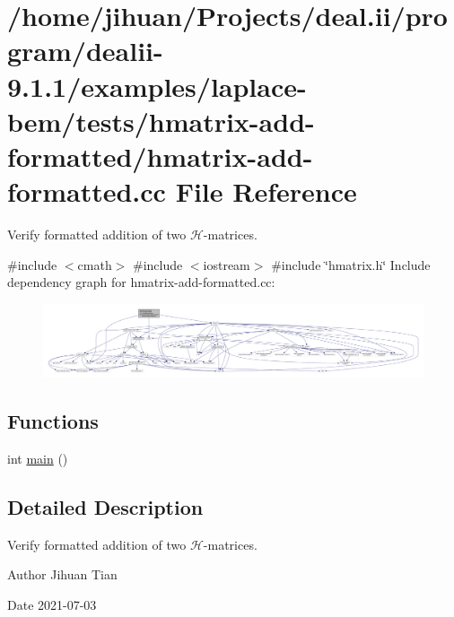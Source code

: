 \hypertarget{hmatrix-add-formatted_8cc}{}\section{/home/jihuan/\+Projects/deal.ii/program/dealii-\/9.1.1/examples/laplace-\/bem/tests/hmatrix-\/add-\/formatted/hmatrix-\/add-\/formatted.cc File Reference}
\label{hmatrix-add-formatted_8cc}


Verify formatted addition of two $\mathcal{H}$-\/matrices.  


{\ttfamily \#include $<$cmath$>$}\newline
{\ttfamily \#include $<$iostream$>$}\newline
{\ttfamily \#include \char`\"{}hmatrix.\+h\char`\"{}}\newline
Include dependency graph for hmatrix-\/add-\/formatted.cc\+:\nopagebreak
\begin{figure}[H]
\begin{center}
\leavevmode
\includegraphics[width=350pt]{hmatrix-add-formatted_8cc__incl}
\end{center}
\end{figure}
\subsection*{Functions}
\begin{DoxyCompactItemize}
\item 
int \hyperlink{hmatrix-add-formatted_8cc_ae66f6b31b5ad750f1fe042a706a4e3d4}{main} ()
\end{DoxyCompactItemize}


\subsection{Detailed Description}
Verify formatted addition of two $\mathcal{H}$-\/matrices. 

\begin{DoxyAuthor}{Author}
Jihuan Tian 
\end{DoxyAuthor}
\begin{DoxyDate}{Date}
2021-\/07-\/03 
\end{DoxyDate}


